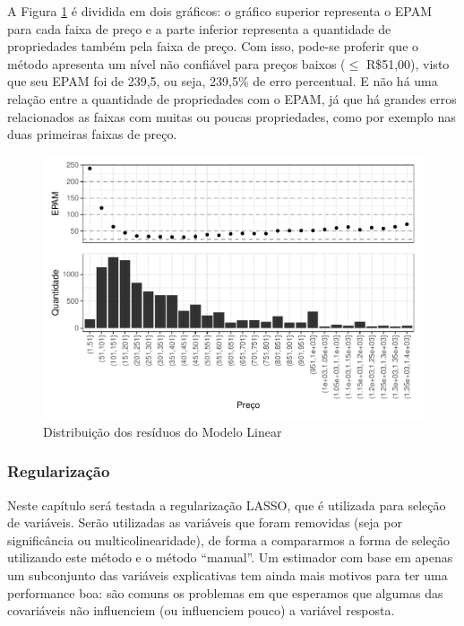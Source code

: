\documentclass[
	12pt,				%
	a4paper,		%
	oneside,    %
	chapter=TITLE,		   %
	section=TITLE,		   %
	subsection=TITLE,	   %
	subsubsection=TITLE, %
	english,			%
	french,				%
	spanish,			%
	brazil,				%
]{abntex2}
\begin{document}
A Figura \ref{graf_resid_ml} é dividida em dois gráficos: o gráfico
superior representa o EPAM para cada faixa de preço e a parte inferior
representa a quantidade de propriedades também pela faixa de preço. Com
isso, pode-se proferir que o método apresenta um nível não confiável
para preços baixos (\(\leq\) R\$51,00), visto que seu EPAM foi de 239,5,
ou seja, 239,5\% de erro percentual. E não há uma relação entre a
quantidade de propriedades com o EPAM, já que há grandes erros
relacionados as faixas com muitas ou poucas propriedades, como por
exemplo nas duas primeiras faixas de preço.

\begin{figure}
\centering
\includegraphics{00-TCC_files/figure-latex/graf_resid_ml-1.pdf}
\caption{\label{graf_resid_ml}Distribuição dos resíduos do Modelo
Linear}
\end{figure}

\hypertarget{regularizauxe7uxe3o-1}{%
\subsubsection{Regularização}\label{regularizauxe7uxe3o-1}}

Neste capítulo será testada a regularização LASSO, que é utilizada para
seleção de variáveis. Serão utilizadas as variáveis que foram removidas
(seja por significância ou multicolinearidade), de forma a compararmos a
forma de seleção utilizando este método e o método ``manual''. Um
estimador com base em apenas um subconjunto das variáveis explicativas
tem ainda mais motivos para ter uma performance boa: são comuns os
problemas em que esperamos que algumas das covariáveis não influenciem
(ou influenciem pouco) a variável resposta.
\end{document}
